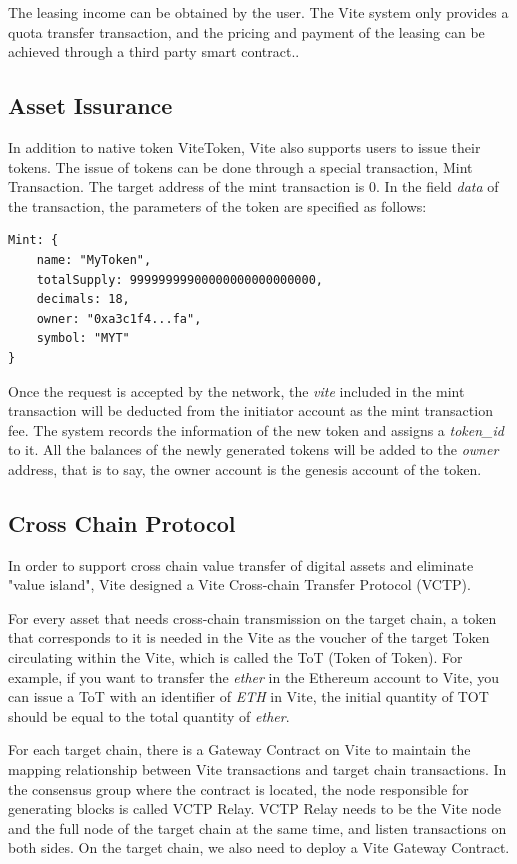 \documentclass[UTF8,nofonts]{article}
\begin{document}
\begin{multicols}{2}
The leasing income can be obtained by the user. The Vite system only provides a quota transfer transaction, and the pricing and payment of the leasing can be achieved through a third party smart contract..

\subsection{Asset Issurance}
In addition to native token ViteToken, Vite also supports users to issue their tokens. The issue of tokens can be done through a special transaction, Mint Transaction. The target address of the mint transaction is 0. In the field \textit{data} of the transaction, the parameters of the token are specified as follows:

\begin{verbatim}
Mint: {
    name: "MyToken",
   	totalSupply: 99999999900000000000000000,
   	decimals: 18,
   	owner: "0xa3c1f4...fa",
    symbol: "MYT"
}
\end{verbatim}

Once the request is accepted by the network, the \textit{vite} included in the mint transaction will be deducted from the initiator account as the mint transaction fee. The system records the information of the new token and assigns a \textit{token\_id} to it. All the balances of the newly generated tokens will be added to the \textit{owner} address, that is to say, the owner account is the genesis account of the token.

\subsection{Cross Chain Protocol}
In order to support cross chain value transfer of digital assets and eliminate "value island", Vite designed a Vite Cross-chain Transfer Protocol (VCTP).

For every asset that needs cross-chain transmission on the target chain, a token that corresponds to it is needed in the Vite as the voucher of the target Token circulating within the Vite, which is called the ToT (Token of Token). For example, if you want to transfer the \textit{ether} in the Ethereum account to Vite, you can issue a ToT with an identifier of \textit{ETH} in Vite, the initial quantity of TOT should be equal to the total quantity of \textit{ether}.

For each target chain, there is a Gateway Contract on Vite to maintain the mapping relationship between Vite transactions and target chain transactions. In the consensus group where the contract is located, the node responsible for generating blocks is called VCTP Relay. VCTP Relay needs to be the Vite node and the full node of the target chain at the same time, and listen transactions on both sides. On the target chain, we also need to deploy a Vite Gateway Contract.


\end{multicols}
\end{document}
